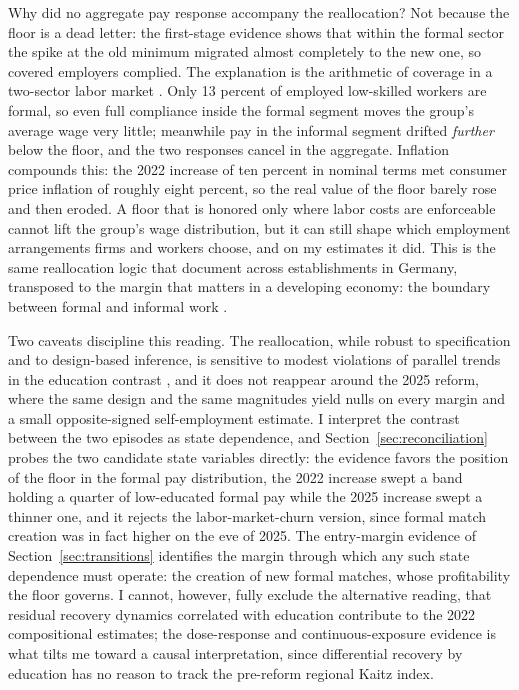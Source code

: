 Why did no aggregate pay response accompany the reallocation? Not because the floor is a dead letter: the first-stage evidence shows that within the formal sector the spike at the old minimum migrated almost completely to the new one, so covered employers complied. The explanation is the arithmetic of coverage in a two-sector labor market \citep{ulyssea_2018}. Only 13 percent of employed low-skilled workers are formal, so even full compliance inside the formal segment moves the group's average wage very little; meanwhile pay in the informal segment drifted \emph{further} below the floor, and the two responses cancel in the aggregate. Inflation compounds this: the 2022 increase of ten percent in nominal terms met consumer price inflation of roughly eight percent, so the real value of the floor barely rose and then eroded. A floor that is honored only where labor costs are enforceable cannot lift the group's wage distribution, but it can still shape which employment arrangements firms and workers choose, and on my estimates it did. This is the same reallocation logic that \citet{dustmann_2022} document across establishments in Germany, transposed to the margin that matters in a developing economy: the boundary between formal and informal work \citep{jales_2018}.

Two caveats discipline this reading. The reallocation, while robust to specification and to design-based inference, is sensitive to modest violations of parallel trends in the education contrast \citep{rambachan_roth_2023}, and it does not reappear around the 2025 reform, where the same design and the same magnitudes yield nulls on every margin and a small opposite-signed self-employment estimate. I interpret the contrast between the two episodes as state dependence, and Section~\ref{sec:reconciliation} probes the two candidate state variables directly: the evidence favors the position of the floor in the formal pay distribution, the 2022 increase swept a band holding a quarter of low-educated formal pay while the 2025 increase swept a thinner one, and it rejects the labor-market-churn version, since formal match creation was in fact higher on the eve of 2025. The entry-margin evidence of Section~\ref{sec:transitions} identifies the margin through which any such state dependence must operate: the creation of new formal matches, whose profitability the floor governs. I cannot, however, fully exclude the alternative reading, that residual recovery dynamics correlated with education contribute to the 2022 compositional estimates; the dose-response and continuous-exposure evidence is what tilts me toward a causal interpretation, since differential recovery by education has no reason to track the pre-reform regional Kaitz index.

